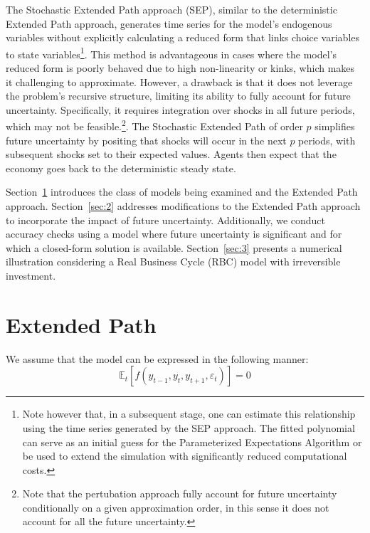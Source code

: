 \documentclass[a4paper,11pt]{amsart}
\begin{document}
The Stochastic Extended Path approach (SEP), similar to the
deterministic Extended Path approach, generates time series for the
model's endogenous variables without explicitly calculating a reduced
form that links choice variables to state variables\footnote{Note
   however that, in a subsequent stage, one can estimate this
   relationship using the time series generated by the SEP
   approach. The fitted polynomial can serve as an initial guess for
   the Parameterized Expectations Algorithm or be used to extend the
   simulation with significantly reduced computational costs.}. This
method is advantageous in cases where the model's reduced form is
poorly behaved due to high non-linearity or kinks, which makes it
challenging to approximate. However, a drawback is that it does not
leverage the problem's recursive structure, limiting its ability to
fully account for future uncertainty. Specifically, it requires
integration over shocks in all future periods, which may not be feasible.\footnote{Note that the pertubation
   approach fully account for future uncertainty conditionally on a
   given approximation order, in this sense it does not account for all
   the future uncertainty.}.
The Stochastic Extended Path of order \( p \) simplifies future
uncertainty by positing that shocks will occur in the next \( p \)
periods, with subsequent shocks set to their expected
values.  Agents then expect that the
economy goes back to the deterministic steady state.\newline

Section~\ref{sec:1} introduces the class of models being examined and
the Extended Path approach. Section~\ref{sec:2} addresses
modifications to the Extended Path approach to incorporate the impact
of future uncertainty. Additionally, we conduct accuracy checks using
a model where future uncertainty is significant and for which a
closed-form solution is available. Section~\ref{sec:3} presents a
numerical illustration considering a Real Business Cycle (RBC) model
with irreversible investment.

\section{Extended Path}\label{sec:1}

We assume that the model can be expressed in the following manner:
\begin{equation}\label{eq:model}
   \mathbb E_t\left[f\left( y_{t-1}, y_t, y_{t+1}, \varepsilon_t \right)\right] = 0
\end{equation}
\end{document}
